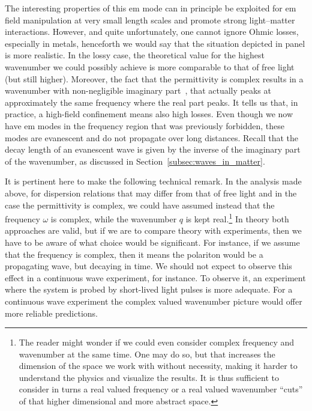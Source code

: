 The interesting properties of this \gls{em} mode can in principle be exploited for \gls{em} field manipulation at very small length scales and promote strong light--matter interactions.
However, and quite unfortunately, one cannot ignore Ohmic losses, especially in metals, henceforth we would say that the situation depicted in panel  is more realistic.
In the lossy case, the theoretical value for the highest wavenumber we could possibly achieve is more comparable to that of free light (but still higher).
Moreover, the fact that the permittivity is complex results in a wavenumber with non-negligible imaginary part~\cite{Wolff_2018}, that actually peaks at approximately the same frequency where the real part peaks.
It tells us that, in practice, a high-field confinement means also high losses.
Even though we now have \gls{em} modes in the frequency region that was previously forbidden, these modes are evanescent and do not propagate over long distances.
Recall that the decay length of an evanescent wave is given by the inverse of the imaginary part of the wavenumber, as discussed in Section~\ref{subsec:waves_in_matter}.


It is pertinent here to make the following technical remark.
In the analysis made above, for dispersion relations that may differ from that of free light and in the case the permittivity is complex, we could have assumed instead that the frequency $\omega$ is complex, while the wavenumber $q$ is kept real.\footnote{The reader might wonder if we could even consider complex frequency and wavenumber at the same time. One may do so, but that increases the dimension of the space we work with without necessity, making it harder to understand the physics and visualize the results. It is thus sufficient to consider in turns a real valued frequency or a real valued wavenumber ``cuts'' of that higher dimensional and more abstract space.\label{fn:complex_frequency}}
In theory both approaches are valid, but if we are to compare theory with experiments, then we have to be aware of what choice would be significant.
For instance, if we assume that the frequency is complex, then it means the polariton would be a propagating wave, but decaying in time.
We should not expect to observe this effect in a continuous wave experiment, for instance.
To observe it, an experiment where the system is probed by short-lived light pulses is more adequate.
For a continuous wave experiment the complex valued wavenumber picture would offer more reliable predictions.

